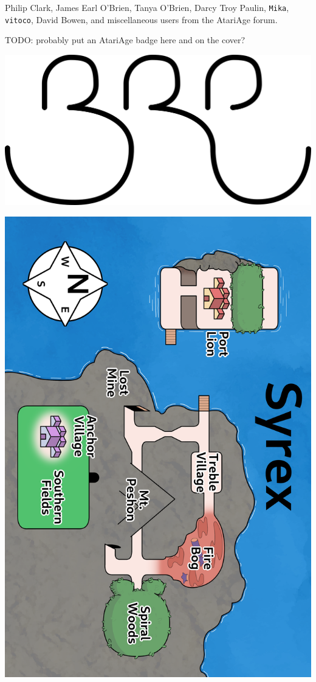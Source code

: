 \documentclass[10pt,twocolumn,openany,article]{memoir}
\begin{document}
Philip Clark,
James Earl O'Brien,
Tanya O'Brien,
Darcy Troy Paulin,
\texttt{Mika},
\texttt{vitoco},
David Bowen,
and miscellaneous users from the AtariAge forum.

\vfill

\ifdefined\ATARIAGESAVE
TODO: probably put an AtariAge badge here and on the cover?
\fi

\begin{center}
  \includegraphics[width=.333\columnwidth]{../Manual/BRP.png}
\end{center}

\clearpage
{}
\thispagestyle{empty}
\includegraphics*{../Manual/SyrexMap.png}
\end{document}
